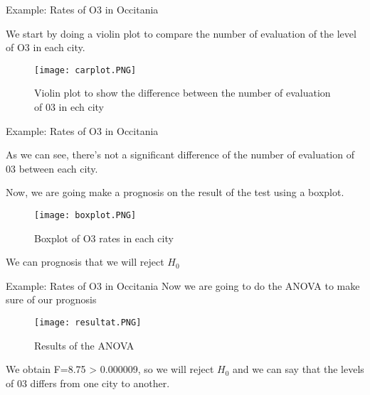 \documentclass[unknownkeysallowed]{beamer}
\begin{document}
\begin{frame}{Example: Rates of O3 in Occitania}

We start by doing a violin plot to compare the number of evaluation of the level of O3 in each city. 
\begin{figure}
    \centering
    \texttt{[image: carplot.PNG]}
    \caption{Violin plot to show the difference between the number of evaluation of 03 in ech city}
    \label{fig:my_label}
\end{figure}
\end{frame}

\begin{frame}{Example: Rates of O3 in Occitania}

As we can see, there's not a significant difference of the number of evaluation of 03 between each city.

Now, we are going make a prognosis on the result of the test using a boxplot.

\begin{figure}
    \centering
    \texttt{[image: boxplot.PNG]}
    \caption{ Boxplot of O3 rates in each city}
    \label{fig:my_label}
\end{figure}
 
 We can prognosis that we will reject $H_0$   
\end{frame}

\begin{frame}{Example: Rates of O3 in Occitania}
Now we are going to do the ANOVA to make sure of our prognosis
\begin{figure}
    \centering
    \texttt{[image: resultat.PNG]}
    \caption{Results of the ANOVA}
    \label{fig:my_label}
\end{figure}
We obtain F=8.75 > 0.000009, so we will reject $H_0$ and we can say that the levels of 03 differs from one city to another.
\end{frame}
\end{document}
